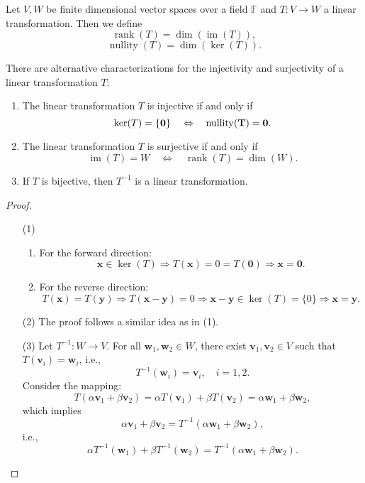 \begin{definition}
 Let \(V, W\) be finite dimensional vector spaces over a field \(\mathbb{F}\) and \(T : V \rightarrow W\) a linear transformation. Then we define
\[
\operatorname{rank}\left( T\right) = \dim \left( \operatorname{im}\left( T\right) \right),
\]
\[
\operatorname{nullity}\left( T\right) = \dim \left( \ker \left( T\right) \right).
\]
\end{definition}

\begin{proposition}
There are alternative characterizations for the injectivity and surjectivity of a linear transformation \(T\):
\begin{enumerate}
  \item The linear transformation \(T\) is injective if and only if
  \[ \ker(T) = \{\bf 0\} \quad \Leftrightarrow \quad \operatorname{nullity}(T) = 0. \]

  \item The linear transformation \(T\) is surjective if and only if
  \[ \operatorname{im}(T) = W \quad \Leftrightarrow \quad \operatorname{rank}(T) = \dim(W). \]

  \item If \(T\) is bijective, then \(T^{-1}\) is a linear transformation.
\end{enumerate}
\end{proposition}

\begin{proof}
\begin{enumerate}
  \item[(1)]
  \begin{enumerate}
    \item For the forward direction:
    \[
    \mathbf{x} \in \ker(T) \Rightarrow T(\mathbf{x}) = 0 = T(\mathbf{0}) \Rightarrow \mathbf{x} = \mathbf{0}.
    \]
    \item For the reverse direction:
    \[
    T(\mathbf{x}) = T(\mathbf{y}) \Rightarrow T(\mathbf{x} - \mathbf{y}) = 0 \Rightarrow \mathbf{x} - \mathbf{y} \in \ker(T) = \{0\} \Rightarrow \mathbf{x} = \mathbf{y}.
    \]
  \end{enumerate}

  \item[(2)] The proof follows a similar idea as in (1).

  \item[(3)] Let \(T^{-1} : W \rightarrow V\). For all \(\mathbf{w}_1, \mathbf{w}_2 \in W\), there exist \(\mathbf{v}_1, \mathbf{v}_2 \in V\) such that \(T(\mathbf{v}_i) = \mathbf{w}_i\), i.e.,
  \[ T^{-1}(\mathbf{w}_i) = \mathbf{v}_i, \quad i = 1, 2. \]
  Consider the mapping:
  \[
  T(\alpha \mathbf{v}_1 + \beta \mathbf{v}_2) = \alpha T(\mathbf{v}_1) + \beta T(\mathbf{v}_2) = \alpha \mathbf{w}_1 + \beta \mathbf{w}_2,
  \]
  which implies
  \[
  \alpha \mathbf{v}_1 + \beta \mathbf{v}_2 = T^{-1}(\alpha \mathbf{w}_1 + \beta \mathbf{w}_2),
  \]
  i.e.,
  \[
  \alpha T^{-1}(\mathbf{w}_1) + \beta T^{-1}(\mathbf{w}_2) = T^{-1}(\alpha \mathbf{w}_1 + \beta \mathbf{w}_2).
  \]
\end{enumerate}
\end{proof}


